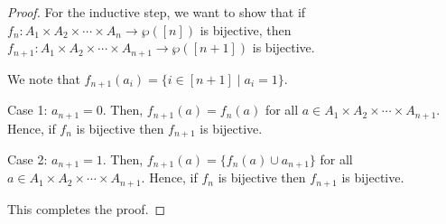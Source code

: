 \documentclass[11pt]{article}
\theoremstyle{definition}
\numberwithin{equation}{subsection}
\begin{document}
\begin{enumerate}
\begin{enumerate}
\begin{proof}
For the inductive step, we want to show that if $f_n \colon A_1\times A_2\times\cdots\times A_n \rightarrow \wp([n])$ is bijective, then $f_{n+1} \colon A_1\times A_2\times\cdots\times A_{n+1} \rightarrow \wp([n+1])$ is bijective.

We note that $f_{n+1}(a_i) = \{i \in [n+1] \mid a_i = 1 \}$.

Case 1: $a_{n+1} = 0$. Then, $f_{n+1} (a) = f_n(a)$ for all $a \in A_1\times A_2\times\cdots\times A_{n+1}$. Hence, if $f_n$ is bijective then $f_{n+1}$ is bijective.

Case 2: $a_{n+1} = 1$. Then, $f_{n+1} (a) = \{f_n(a) \cup a_{n+1}\}$ for all $a \in A_1\times A_2\times\cdots\times A_{n+1}$. Hence, if $f_n$ is bijective then $f_{n+1}$ is bijective.

This completes the proof.

\renewcommand\qedsymbol{QED}
\end{proof}

 \end{enumerate}





\end{enumerate}
\end{document}
